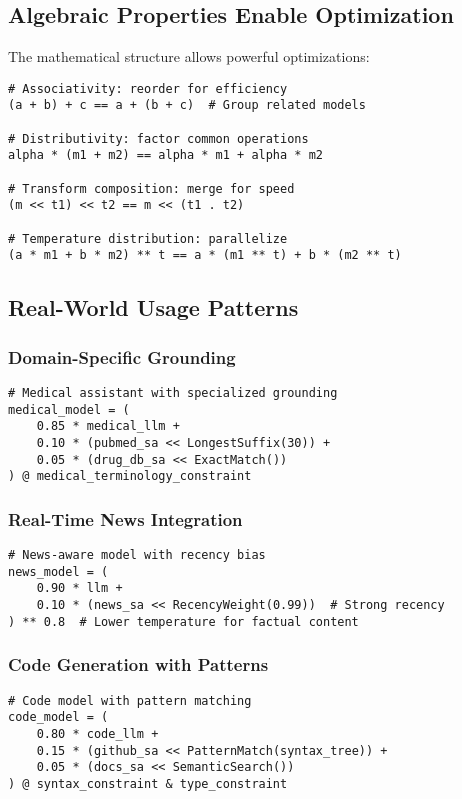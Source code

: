 \documentclass{article}
\theoremstyle{definition}
\begin{document}
\subsection{Algebraic Properties Enable Optimization}

The mathematical structure allows powerful optimizations:

\begin{lstlisting}
# Associativity: reorder for efficiency
(a + b) + c == a + (b + c)  # Group related models

# Distributivity: factor common operations
alpha * (m1 + m2) == alpha * m1 + alpha * m2

# Transform composition: merge for speed
(m << t1) << t2 == m << (t1 . t2)

# Temperature distribution: parallelize
(a * m1 + b * m2) ** t == a * (m1 ** t) + b * (m2 ** t)
\end{lstlisting}

\subsection{Real-World Usage Patterns}

\subsubsection{Domain-Specific Grounding}
\begin{lstlisting}
# Medical assistant with specialized grounding
medical_model = (
    0.85 * medical_llm +
    0.10 * (pubmed_sa << LongestSuffix(30)) +
    0.05 * (drug_db_sa << ExactMatch())
) @ medical_terminology_constraint
\end{lstlisting}

\subsubsection{Real-Time News Integration}
\begin{lstlisting}
# News-aware model with recency bias
news_model = (
    0.90 * llm +
    0.10 * (news_sa << RecencyWeight(0.99))  # Strong recency
) ** 0.8  # Lower temperature for factual content
\end{lstlisting}

\subsubsection{Code Generation with Patterns}
\begin{lstlisting}
# Code model with pattern matching
code_model = (
    0.80 * code_llm +
    0.15 * (github_sa << PatternMatch(syntax_tree)) +
    0.05 * (docs_sa << SemanticSearch())
) @ syntax_constraint & type_constraint
\end{lstlisting}
\end{document}
